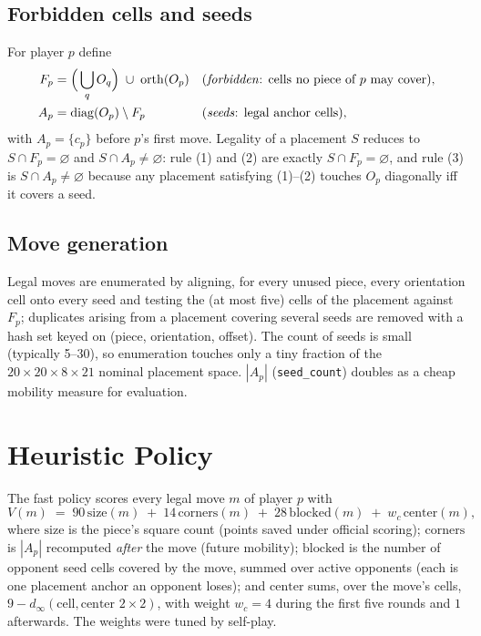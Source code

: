 \documentclass[11pt]{article}
\newcommand{\code}[1]{\texttt{#1}}
\begin{document}
\subsection{Forbidden cells and seeds}

For player $p$ define
\begin{align}
F_p &= \Big(\bigcup_q O_q\Big)\;\cup\;\mathrm{orth}(O_p)
      &&\text{(\emph{forbidden}: cells no piece of $p$ may cover)},\\
A_p &= \mathrm{diag}(O_p)\setminus F_p
      &&\text{(\emph{seeds}: legal anchor cells)},
\end{align}
with $A_p=\{c_p\}$ before $p$'s first move. Legality of a placement $S$
reduces to $S\cap F_p=\varnothing$ and $S\cap A_p\neq\varnothing$: rule (1)
and (2) are exactly $S \cap F_p = \varnothing$, and rule (3) is
$S\cap A_p\neq\varnothing$ because any placement satisfying (1)--(2) touches
$O_p$ diagonally iff it covers a seed.

\subsection{Move generation}

Legal moves are enumerated by aligning, for every unused piece, every
orientation cell onto every seed and testing the (at most five) cells of the
placement against $F_p$; duplicates arising from a placement covering several
seeds are removed with a hash set keyed on (piece, orientation, offset). The
count of seeds is small (typically 5--30), so enumeration touches only a tiny
fraction of the $20\times 20\times 8\times 21$ nominal placement space.
$|A_p|$ (\code{seed\_count}) doubles as a cheap mobility measure for
evaluation.

\section{Heuristic Policy}
\label{sec:heuristic}

The fast policy scores every legal move $m$ of player $p$ with
\begin{equation}
\label{eq:eval}
V(m) \;=\; 90\,\mathrm{size}(m)
      \;+\; 14\,\mathrm{corners}(m)
      \;+\; 28\,\mathrm{blocked}(m)
      \;+\; w_c\,\mathrm{center}(m),
\end{equation}
where $\mathrm{size}$ is the piece's square count (points saved under
official scoring); $\mathrm{corners}$ is $|A_p|$ recomputed \emph{after} the
move (future mobility); $\mathrm{blocked}$ is the number of opponent seed
cells covered by the move, summed over active opponents (each is one
placement anchor an opponent loses); and $\mathrm{center}$ sums, over the
move's cells, $9-d_\infty(\text{cell},\text{center }2\times 2)$, with weight
$w_c=4$ during the first five rounds and $1$ afterwards. The weights were
tuned by self-play.
\end{document}

